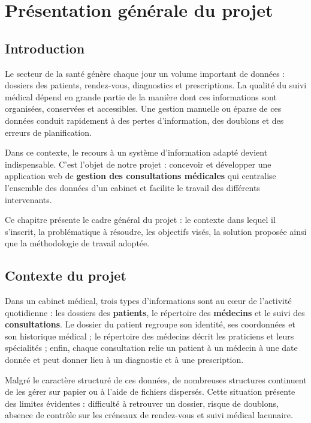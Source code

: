 \chapter{Présentation générale du projet}

\section{Introduction}

Le secteur de la santé génère chaque jour un volume important de données : dossiers des patients, rendez-vous, diagnostics et prescriptions. La qualité du suivi médical dépend en grande partie de la manière dont ces informations sont organisées, conservées et accessibles. Une gestion manuelle ou éparse de ces données conduit rapidement à des pertes d'information, des doublons et des erreurs de planification.

Dans ce contexte, le recours à un système d'information adapté devient indispensable. C'est l'objet de notre projet : concevoir et développer une application web de \textbf{gestion des consultations médicales} qui centralise l'ensemble des données d'un cabinet et facilite le travail des différents intervenants.

Ce chapitre présente le cadre général du projet : le contexte dans lequel il s'inscrit, la problématique à résoudre, les objectifs visés, la solution proposée ainsi que la méthodologie de travail adoptée.

\section{Contexte du projet}

Dans un cabinet médical, trois types d'informations sont au cœur de l'activité quotidienne : les dossiers des \textbf{patients}, le répertoire des \textbf{médecins} et le suivi des \textbf{consultations}. Le dossier du patient regroupe son identité, ses coordonnées et son historique médical ; le répertoire des médecins décrit les praticiens et leurs spécialités ; enfin, chaque consultation relie un patient à un médecin à une date donnée et peut donner lieu à un diagnostic et à une prescription.

Malgré le caractère structuré de ces données, de nombreuses structures continuent de les gérer sur papier ou à l'aide de fichiers dispersés. Cette situation présente des limites évidentes : difficulté à retrouver un dossier, risque de doublons, absence de contrôle sur les créneaux de rendez-vous et suivi médical lacunaire.

